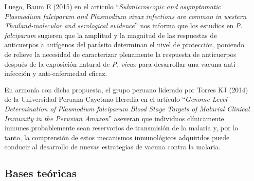 \documentclass[]{article}
\begin{document}
Luego, Baum E (2015) en el artículo ``\emph{Submicroscopic and
asymptomatic Plasmodium falciparum and Plasmodium vivax infections are
common in western Thailand-molecular and serological evidence}'' nos
informa que los estudios en \emph{P. falciparum} sugieren que la
amplitud y la magnitud de las respuestas de anticuerpos a antígenos del
parásito determinan el nivel de protección, poniendo de relieve la
necesidad de caracterizar plenamente la respuesta de anticuerpos después
de la exposición natural de \emph{P. vivax} para desarrollar una vacuna
anti-infección y anti-enfermedad eficaz.

En armonía con dicha propuesta, el grupo peruano liderado por Torres KJ
(2014) de la Universidad Peruana Cayetano Heredia en el artículo
``\emph{Genome-Level Determination of Plasmodium falciparum Blood Stage
Targets of Malarial Clinical Immunity in the Peruvian Amazon}'' aseveran
que individuos clínicamente inmunes probablemente sean reservorios de
transmisión de la malaria y, por lo tanto, la comprensión de estos
mecanismos inmunológicos adquiridos puede conducir al desarrollo de
nuevas estrategias de vacuna contra la malaria.

\subsection{Bases teóricas}\label{bases-teoricas}
\end{document}
